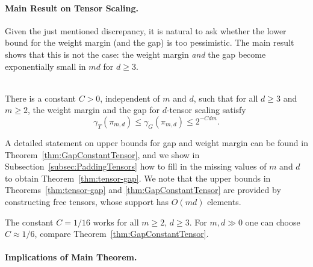 \paragraph{Main Result on Tensor Scaling.}

Given the just mentioned discrepancy, it is natural to ask whether the lower bound for the weight margin (and the gap) is too pessimistic. The main result shows that this is not the case: the weight margin \emph{and} the gap become exponentially small in $md$ for $d \geq 3$. 

\begin{theorem} \label{thm:tensor-gap}
	\ \\
	There is a constant $C > 0$, independent of $m$ and $d$, such that for all $d \geq 3$ and $m \geq 2$, the weight margin and the gap for $d$-tensor scaling satisfy
	\[ \gamma_{T}(\pi_{m,d}) \leq \gamma_G(\pi_{m,d}) \leq 2^{-C dm}. \]
\end{theorem}

A detailed statement on upper bounds for gap and weight margin can be found in Theorem~\ref{thm:GapConstantTensor}, and we show in Subsection~\ref{subsec:PaddingTensors} how to fill in the missing values of $m$ and $d$ to obtain Theorem~\ref{thm:tensor-gap}.
We note that the upper bounds in Theorems~\ref{thm:tensor-gap} and \ref{thm:GapConstantTensor} are provided by constructing free tensors, whose support has $O(md)$ elements.

\begin{remark} \label{rem:ConstantTensorGap}
	The constant $C = 1/16$ works for all $m \geq 2$, $d \geq 3$. For $m, d \gg 0$ one can choose $C \approx 1/6$, compare Theorem~\ref{thm:GapConstantTensor}.
	\hfill\remSymbol
\end{remark}


\paragraph{Implications of Main Theorem.}

